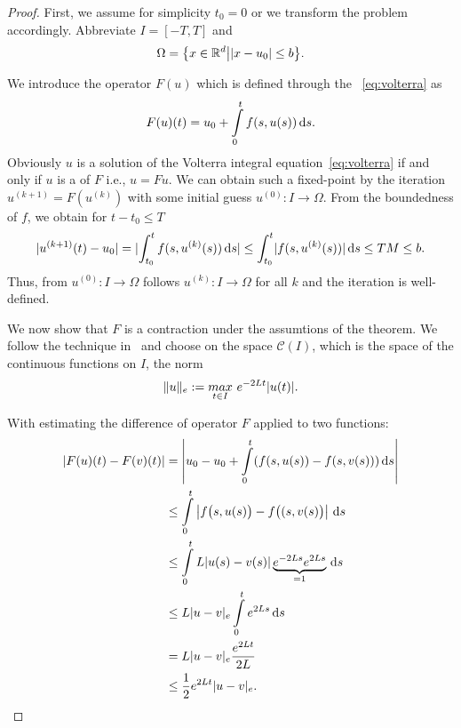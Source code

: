 \begin{proof}
  First, we assume for simplicity $t_0=0$ or we transform the problem
  accordingly. Abbreviate $I = [-T,T]$ and
  \begin{gather*}
    \Omega = \bigl\{x\in \mathbb R^d\big| \lvert x-u_0\rvert \le b \bigr\}.
  \end{gather*}

  We introduce the operator $F(u)$ which is defined
  through the ~\eqref{eq:volterra} as
  \begin{gather}
    \label{eq:awa:16}
   F(u)(t) = u_0 + \int\limits_{0}^t f(s,u(s)) \,\mathrm{d} s.
  \end{gather}
  Obviously $u$ is a solution of the Volterra integral
  equation~\eqref{eq:volterra} if and only if $u$ is a  of $F$ i.e., $u=Fu$. We can obtain such a fixed-point by
  the iteration $u^{(k+1)} = F(u^{(k)})$ with some initial guess
  $u^{(0)}:I\to\Omega$. From the boundedness of $f$, we obtain for
  $t-t_0 \le T$
  \begin{align*}
    \lvert u^{(k+1)}(t)-u_0\rvert = \lvert\int_{t_0}^t f(s,u^{(k)}(s))\,\mathrm{d} s\rvert \le \int_{t_0}^t
    \lvert f(s,u^{(k)}(s))\rvert\,\mathrm{d} s \le TM \le b.
  \end{align*}
  Thus, from $u^{(0)}:I\to\Omega$ follows $u^{(k)}:I\to\Omega$ for all
  $k$ and the iteration is well-defined.
  
  We now show that $F$ is a contraction under the assumtions of the
  theorem. We follow the technique
  in~\cite[\S117]{Heuser86} and choose on the space $\mathcal C(I)$,
  which is the space of the continuous functions on $I$, the norm
  \begin{gather*}
    \lVert u\rVert_e := \underset{t \in I}{max} ~e^{-2 L t} |u(t)|.
  \end{gather*}
  
  With estimating the difference of operator $F$ applied to two functions:
  \begin{align*}
    |F(u)(t) - F(v)(t)|
    & = \left| u_0 - u_0 + \int\limits_{0}^t (f(s,u(s)) - f(s,v(s))) \,\mathrm{d} s \right| \\
    & \le \int\limits_{0}^t \left| f\bigl(s,u(s)\bigr) - f\bigl((s,v(s)\bigr) \right| \,\mathrm{d} s \\
    & \le \int\limits_{0}^t L |u(s) - v(s)| \underbrace{e^{-2 L s} e^{2 L s}}_{= 1} \,\mathrm{d} s \\
    & \le L |u-v|_e \int\limits_{0}^t e^{2 L s} \,\mathrm{d} s \\
    & = L |u-v|_e \frac{e^{2 L t}}{2 L} \\
    & \le \frac12 e^{2 L t}|u-v|_e.
  \end{align*}


\end{proof}
